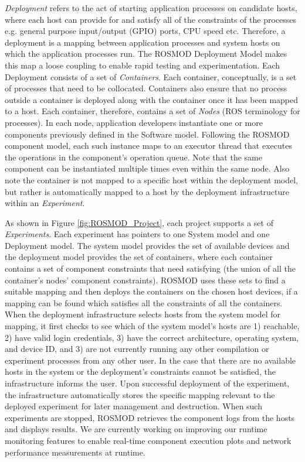 \emph{Deployment} refers to the act of starting application processes
on candidate hosts, where each host can provide for and satisfy all of
the constraints of the processes e.g. general purpose input/output
(GPIO) ports, CPU speed etc. Therefore, a deployment is a mapping
between application processes and system hosts on which the
application processes run.  The ROSMOD Deployment Model makes this map
a loose coupling to enable rapid testing and experimentation. Each
Deployment consists of a set of \emph{Containers}. Each container,
conceptually, is a set of processes that need to be
collocated. Containers also ensure that no process outside a container
is deployed along with the container once it has been mapped to a
host. Each container, therefore, contains a set of \emph{Nodes} (ROS
terminology for processes). In each node, application developers
instantiate one or more components previously defined in the Software
model. Following the ROSMOD component model, each such instance maps to an
executor thread that executes the operations in the component's
operation queue.  Note that the same component can be instantiated
multiple times even within the same node. Also note the container is
not mapped to a specific host within the deployment model, but rather
is automatically mapped to a host by the deployment infrastructure
within an \emph{Experiment}.

As shown in Figure \ref{fig:ROSMOD_Project}, each project supports a
set of \emph{Experiments}. Each experiment has pointers to one System
model and one Deployment model. The system model provides the set of
available devices and the deployment model provides the set of
containers, where each container contains a set of component
constraints that need satisfying (the union of all the container's
nodes' component constraints). ROSMOD uses these sets to find a
suitable mapping and then deploys the containers on the chosen host
devices, if a mapping can be found which satisfies all the constraints
of all the containers.  When the deployment infrastructure selects
hosts from the system model for mapping, it first checks to see which
of the system model's hosts are 1) reachable, 2) have valid login
credentials, 3) have the correct architecture, operating system, and
device ID, and 3) are not currently running any other compilation or
experiment processes from any other user.  In the case that there are
no available hosts in the system or the deployment's constraints
cannot be satisfied, the infrastructure informs the user.  Upon
successful deployment of the experiment, the infrastructure
automatically stores the specific mapping relevant to the deployed
experiment for later management and destruction. When such experiments
are stopped, ROSMOD retrieves the component logs from the hosts and
displays results. We are currently working on improving our runtime
monitoring features to enable real-time component execution plots and
network performance measurements at runtime.


